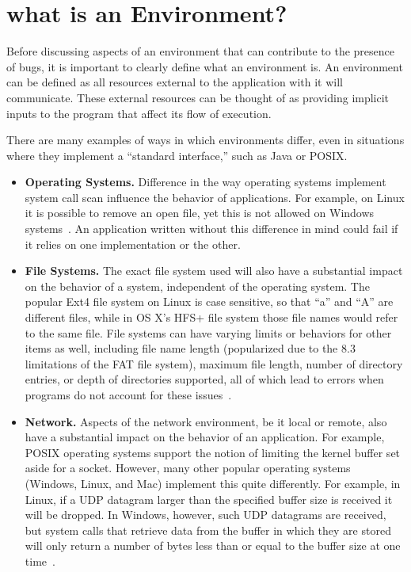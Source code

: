 \section{what is an Environment?}
\label{SEC:background}

Before discussing aspects of an environment that can contribute to the
presence of bugs, it is important to clearly
define what an environment is.  An environment can be defined as
all resources external to the application with it will
communicate.  These external resources can be thought of as
providing implicit inputs to the program that affect its flow of execution.

There are many examples of ways in which environments differ, even in
situations where they implement a ``standard interface,'' such as Java or
POSIX.

\begin{itemize}

\item {\bf Operating Systems.} Difference in the way operating systems
implement system call scan influence the behavior of applications.  For
example, on Linux it is possible to remove an open file, yet this is not
allowed on Windows systems~\cite{UnlinkStandard}.  An application
written without this difference in mind could fail if it relies on one
implementation or the other.

\item {\bf File Systems.}  The exact file system used will also have a
substantial impact on the behavior of a system, independent of the
operating system.  The popular Ext4 file system on Linux is case sensitive,
so that ``a'' and ``A'' are different files, while in OS X's HFS+ file system
those file names would refer to the same file.
File systems can have varying limits or behaviors for other items as well,
including file name length (popularized due to the 8.3 limitations of the
FAT file system), maximum file length, number of directory entries, or
depth
of directories supported, all of which lead to errors when programs
do not account for these issues~\cite{EXT4Layout, AppleHFS}.

\item {\bf Network.}  Aspects of the network environment, be it local or
remote, also have a
substantial impact on the behavior of an application.
For example, POSIX operating
systems support the notion of limiting the kernel buffer set aside for a
socket.  However, many other popular operating
systems (Windows, Linux, and Mac)
implement this quite differently.  For example, in Linux, if a UDP datagram
larger than the specified buffer size is received it will be dropped.  In
Windows, however, such
UDP datagrams are
received, but system calls that retrieve data from the buffer in which
they are
stored will only return a number of bytes less than or equal to the
buffer size at one time~\cite{Zhuang_NSDI_2014}.


\end{itemize}
